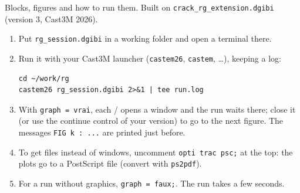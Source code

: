   {Blocks, figures and how to run them. Built on
   \texttt{crack\_rg\_extension.dgibi} (version 3, Cast3M 2026).}


\begin{enumerate}[itemsep=1pt]
\item Put \texttt{rg\_session.dgibi} in a working folder and open a terminal
there.
\item Run it with your Cast3M launcher (\texttt{castem26}, \texttt{castem}, \dots),
keeping a log:
\begin{lstlisting}[style=shstyle]
cd ~/work/rg
castem26 rg_session.dgibi 2>&1 | tee run.log
\end{lstlisting}
\item With \texttt{graph = vrai}, each / opens a window and the
run waits there; close it (or use the continue control of your version) to
go to the next figure. The messages \texttt{FIG k : ...} are printed just
before.
\item To get files instead of windows, uncomment \texttt{opti trac psc;} at
the top: the plots go to a PostScript file (convert with \texttt{ps2pdf}).
\item For a run without graphics, \texttt{graph = faux;}. The run takes a few
seconds.
\end{enumerate}


